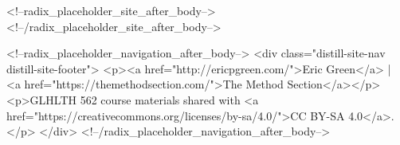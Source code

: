 \documentclass[
]{article}
\begin{document}
<!--radix_placeholder_site_after_body-->
<!--/radix_placeholder_site_after_body-->

<!--radix_placeholder_navigation_after_body-->
<div class="distill-site-nav distill-site-footer">
<p><a href="http://ericpgreen.com/">Eric Green</a> | <a
href="https://themethodsection.com/">The Method Section</a></p>
<p>GLHLTH 562 course materials shared with <a
href="https://creativecommons.org/licenses/by-sa/4.0/">CC BY-SA
4.0</a>.</p>
</div>
<!--/radix_placeholder_navigation_after_body-->
\end{document}
